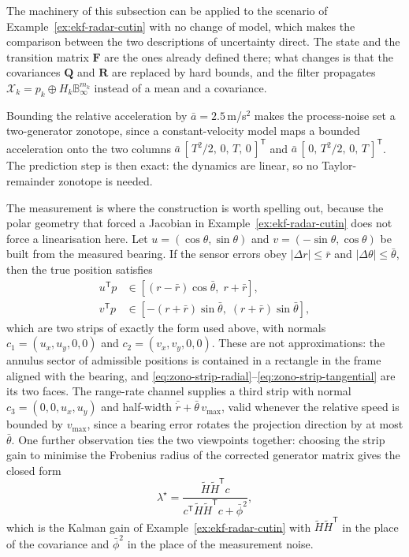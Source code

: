 \documentclass[graybox,envcountchap]{style/SNmono}
\begin{document}
\begin{example}
\label{ex:zono-radar-cutin}
The machinery of this subsection can be applied to the scenario of
Example~\ref{ex:ekf-radar-cutin} with no change of model, which makes the
comparison between the two descriptions of uncertainty direct. The state and
the transition matrix $\mathbf{F}$ are the ones already defined there; what
changes is that the covariances $\mathbf{Q}$ and $\mathbf{R}$ are replaced by
hard bounds, and the filter propagates $\mathcal{X}_k=p_k\oplus H_k\mathbb{B}_{\infty}^{m_k}$
instead of a mean and a covariance.

Bounding the relative acceleration by $\bar a=2.5$\,m/s$^{2}$ makes the
process-noise set a two-generator zonotope, since a constant-velocity model
maps a bounded acceleration onto the two columns
$\bar a\,[\,T^{2}/2,\,0,\,T,\,0\,]^{\mathsf T}$ and
$\bar a\,[\,0,\,T^{2}/2,\,0,\,T\,]^{\mathsf T}$. The prediction step is then
exact: the dynamics are linear, so no Taylor-remainder zonotope is needed.

The measurement is where the construction is worth spelling out, because the
polar geometry that forced a Jacobian in Example~\ref{ex:ekf-radar-cutin} does
not force a linearisation here. Let $u=(\cos\theta,\sin\theta)$ and
$v=(-\sin\theta,\cos\theta)$ be built from the measured bearing. If the sensor
errors obey $|\Delta r|\le\bar r$ and $|\Delta\theta|\le\bar\theta$, then the
true position satisfies
\begin{align}
u^{\mathsf T}p &\in \left[(r-\bar r)\cos\bar\theta,\; r+\bar r\right],
\label{eq:zono-strip-radial}\\
v^{\mathsf T}p &\in \left[-(r+\bar r)\sin\bar\theta,\; (r+\bar r)\sin\bar\theta\right],
\label{eq:zono-strip-tangential}
\end{align}
which are two strips of exactly the form used above, with normals
$c_{1}=(u_x,u_y,0,0)$ and $c_{2}=(v_x,v_y,0,0)$. These are not approximations:
the annulus sector of admissible positions is contained in a rectangle in the
frame aligned with the bearing, and \eqref{eq:zono-strip-radial}--\eqref{eq:zono-strip-tangential}
are its two faces. The range-rate channel supplies a third strip with normal
$c_{3}=(0,0,u_x,u_y)$ and half-width $\bar{\dot r}+\bar\theta\,v_{\max}$, valid
whenever the relative speed is bounded by $v_{\max}$, since a bearing error
rotates the projection direction by at most $\bar\theta$. One further
observation ties the two viewpoints together: choosing the strip gain to
minimise the Frobenius radius of the corrected generator matrix gives the
closed form
\begin{equation}
\lambda^{\star}=\frac{\widetilde H\widetilde H^{\mathsf T}c}{c^{\mathsf T}\widetilde H\widetilde H^{\mathsf T}c+\bar\phi^{2}},
\label{eq:zono-optimal-gain}
\end{equation}
which is the Kalman gain of Example~\ref{ex:ekf-radar-cutin} with
$\widetilde H\widetilde H^{\mathsf T}$ in the place of the covariance and
$\bar\phi^{2}$ in the place of the measurement noise.


\end{example}
\end{document}
